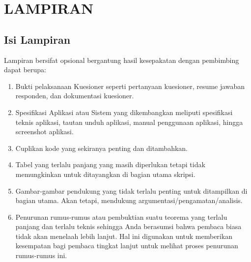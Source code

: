\chapter*{LAMPIRAN}

\section{Isi Lampiran}

Lampiran bersifat opsional bergantung hasil kesepakatan dengan pembimbing 
dapat berupa:

\begin{enumerate}
\item Bukti pelaksanaan Kuesioner seperti pertanyaan kuesioner, resume jawaban 
responden, dan dokumentasi kuesioner. 
\item Spesifikasi Aplikasi atau Sistem yang dikembangkan meliputi spesifikasi 
teknis aplikasi, tautan unduh aplikasi, manual penggunaan aplikasi, hingga 
screenshot aplikasi. 
\item Cuplikan kode yang sekiranya penting dan ditambahkan. 
\item Tabel yang terlalu panjang yang masih diperlukan tetapi tidak 
memungkinkan untuk ditayangkan di bagian utama skripsi.
\item Gambar-gambar pendukung yang tidak terlalu penting untuk ditampilkan di 
bagian utama. Akan tetapi, mendukung argumentasi/pengamatan/analisis.
\item Penurunan rumus-rumus atau pembuktian suatu teorema yang terlalu 
panjang dan terlalu teknis sehingga Anda berasumsi bahwa pembaca biasa 
tidak akan menelaah lebih lanjut. Hal ini digunakan untuk memberikan 
kesempatan bagi pembaca tingkat lanjut untuk melihat proses penurunan 
rumus-rumus ini.
\end{enumerate}